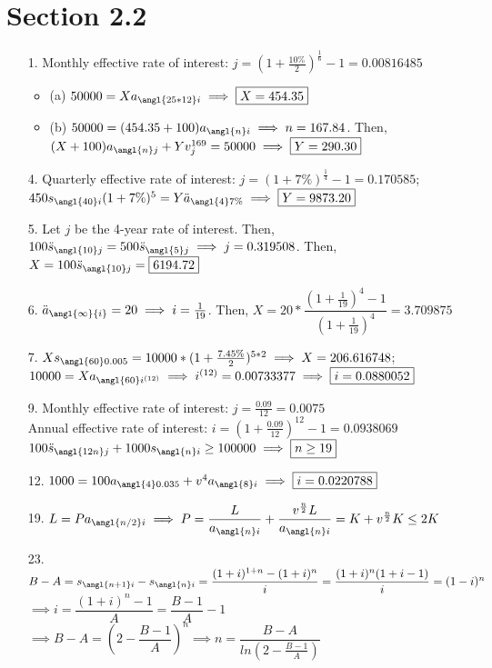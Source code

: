 \documentclass{article}
\begin{document}
\section*{Section 2.2}
\begin{itemize}
	\item [1.] Monthly effective rate of interest: $j=(1+\frac{10\%}{2})^\frac{1}{6}-1=0.00816485$
	      \begin{itemize}
		      \item (a) $50000=Xa_{\angl{25*12}i} \implies \boxed{X=454.35}$
		      \item (b) $50000=(454.35+100)a_{\angl{n}i} \implies n=167.84$. Then, $(X+100)a_{\angl{n}j}+Yv_j^{169}=50000 \implies \boxed{Y=290.30}$
	      \end{itemize}
	\item [4.] Quarterly effective rate of interest: $j=(1+7\%)^\frac{1}{4}-1=0.170585$; $450s_{\angl{40}i}(1+7\%)^5=Y\ddot{a}_{\angl{4}7\%} \implies \boxed{Y=9873.20}$
	\item [5.] Let $j$ be the 4-year rate of interest. Then, $100\ddot{s}_{\angl{10}j}=500\ddot{s}_{\angl{5}j} \implies j=0.319508$. Then, $X=100\ddot{s}_{\angl{10}j}=\boxed{6194.72}$
	\item [6.] $\ddot{a}_{\angl{\infty}{i}}=20 \implies i=\frac{1}{19}$. Then, $X=20*\dfrac{(1+\frac{1}{19})^4-1}{(1+\frac{1}{19})^4}=\boxed{3.709875}$
	\item [7.] $Xs_{\angl{60}0.005}=10000*(1+\frac{7.45\%}{2})^{5*2} \implies X=206.616748$; $10000=Xa_{\angl{60}i^{(12)}} \implies i^{(12)}=0.00733377 \implies \boxed{i=0.0880052}$
	\item [9.] Monthly effective rate of interest: $j=\frac{0.09}{12}=0.0075$\\Annual effective rate of interest: $i=(1+\frac{0.09}{12})^{12}-1=0.0938069$\\$100\ddot{s}_{\angl{12n}j}+1000s_{\angl{n}i}\geq 100000 \implies \boxed{n\geq 19}$
	\item [12.] $1000=100a_{\angl{4}0.035}+v^4a_{\angl{8}i} \implies \boxed{i=0.0220788}$
	\item [19.] $L=Pa_{\angl{n/2}i} \implies P=\dfrac{L}{a_{\angl{n}i}}+\dfrac{v^{\frac{n}{2}}L}{a_{\angl{n}i}}=K+v^{\frac{n}{2}}K\leq 2K$
	\item [23.] $B-A=s_{\angl{n+1}i}-s_{\angl{n}i}=\dfrac{(1+i)^{1+n}-(1+i)^n}{i}=\dfrac{(1+i)^n(1+i-1)}{i}=(1-i)^n$\\$\implies i=\dfrac{(1+i)^n-1}{A}=\boxed{\dfrac{B-1}{A}-1}$\\$\implies B-A=(2-\dfrac{B-1}{A})^n \implies \boxed{n=\dfrac{B-A}{ln(2-\frac{B-1}{A})}}$
\end{itemize}
\end{document}
